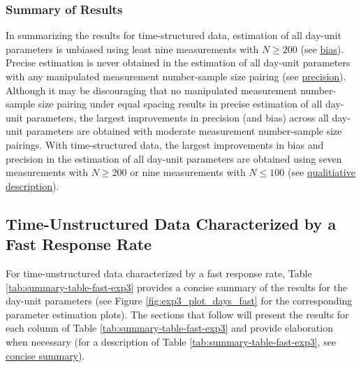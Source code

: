 \documentclass[
12pt, %
twoside,
english]{guelphthesis}
\theoremstyle{definition}
\theoremstyle{definition}
\theoremstyle{definition}
\theoremstyle{definition}
\theoremstyle{remark}
\begin{document}
\hypertarget{summary-of-results-8}{%
\subsubsection{Summary of Results}\label{summary-of-results-8}}

In summarizing the results for time-structured data, estimation of all day-unit parameters is unbiased using least nine measurements with \(N \ge 200\) (see \protect\hyperlink{bias-time-struc-exp3}{bias}). Precise estimation is never obtained in the estimation of all day-unit parameters with any manipulated measurement number-sample size pairing (see \protect\hyperlink{precision-time-struc-exp3}{precision}). Although it may be discouraging that no manipulated measurement number-sample size pairing under equal spacing results in precise estimation of all day-unit parameters, the largest improvements in precision (and bias) across all day-unit parameters are obtained with moderate measurement number-sample size pairings. With time-structured data, the largest improvements in bias and precision in the estimation of all day-unit parameters are obtained using seven measurements with \(N \ge 200\) or nine measurements with \(N \le 100\) (see \protect\hyperlink{qualitative-time-struc-exp3}{qualitiative description}).

\hypertarget{time-unstructured-data-characterized-by-a-fast-response-rate}{%
\subsection{Time-Unstructured Data Characterized by a Fast Response Rate}\label{time-unstructured-data-characterized-by-a-fast-response-rate}}

For time-unstructured data characterized by a fast response rate, Table \ref{tab:summary-table-fast-exp3} provides a concise summary of the results for the day-unit parameters (see Figure \ref{fig:exp3_plot_days_fast} for the corresponding parameter estimation plots). The sections that follow will present the results for each column of Table \ref{tab:summary-table-fast-exp3} and provide elaboration when necessary (for a description of Table \ref{tab:summary-table-fast-exp3}, see \protect\hyperlink{concise-example-exp3}{concise summary}).
\end{document}
